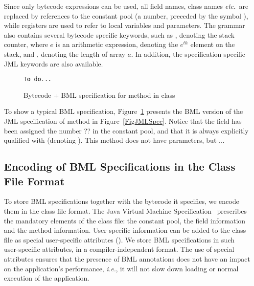 Since only bytecode expressions can be used, all field names, class
names \emph{etc.}\ are replaced by references to the constant pool (a
number, preceded by the symbol \codeHook{\#}), while registers are
used to refer to local variables and parameters. The grammar also
contains several bytecode specific keywords, such as ,
denoting the stack counter,  where \(e\) is an
arithmetic expression, denoting the \(e^{th}\) element on the stack, and
, denoting the length of array \(a\). In
addition, the specification-specific JML keywords are also available.




\begin{figure}[t]
{\small
\begin{verbatim}
To do...
\end{verbatim}
}
\vspace*{-1em}\caption{Bytecode + BML specification for method  in class }\label{FigBMLSpec}
\end{figure}

To show a typical BML specification, Figure~\ref{FigBMLSpec} presents
the BML version of the JML specification of method
 in Figure~\ref{FigJMLSpec}. 
Notice that the
field  has been assigned the number ?? in the constant
pool, and that it is always explicitly qualified with 
(denoting ). This method does not have parameters, but 
... 


 
\subsection{Encoding of BML Specifications in the Class File Format}

To store BML specifications together with the bytecode it specifies,
we encode them in the class file format. The Java Virtual Machine
Specification~\cite{JVMspec} prescribes the mandatory elements of the
class file: the constant pool, the field information and the method
information. User-specific information can be added to the class file
as special user-specific attributes (\cite[\S4.7.1]{JVMspec}).  We
store BML specifications in such user-specific attributes, in a
compiler-independent format. The use of special attributes ensures
that the presence of BML annotations does not have an impact on the
application's performance, \emph{i.e.}, it will not slow down loading
or normal execution of the application.

